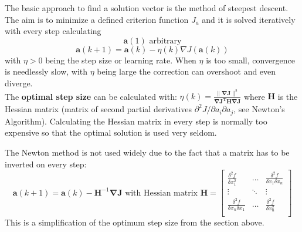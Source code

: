       The basic approach to find a solution vector is the method of steepest descent. The aim is to
      minimize a defined criterion function $J_a$ and it is solved iteratively with every step calculating
      $$\bm a (1) \text{ arbitrary}$$
      $$\bm a (k+1) =  \bm a(k) - \eta(k) \nabla J(\bm a(k))$$
      with $\eta > 0$ being the step size or learning rate. When $\eta$ is too small, convergence is
      needlessly slow, with $\eta$ being large the correction can overshoot and even diverge.\\
      The \textbf{optimal step size} can be calculated with:
      $\eta(k)= \frac{\|\bm{\nabla J}\|^2}{\bm{\nabla J^T  H \nabla J}}$ where $\bm H$ is the Hessian matrix
       (matrix of second partial derivatives $\partial^2 J / \partial a_i \partial a_j$, see Newton's Algorithm).
      Calculating the Hessian matrix in every step is normally too expensive so that the optimal solution is used very seldom.

      The Newton method is not used widely due to the fact that a matrix has to be inverted on every
      step:
      $$\bm a(k+1) = \bm a(k) - \bm H^{-1} \bm \nabla \bm J \text{ with Hessian matrix } \bm H = \begin{bmatrix}
      \frac{\delta^2 f}{\delta x_1^2} & \ldots & \frac{\delta^2 f}{\delta x_1 \delta x_n}\\
      \vdots & \ddots & \vdots \\
      \frac{\delta^2 f}{\delta x_n \delta x_1} & \ldots & \frac{\delta^2 f}{\delta x_n^2}\\
      \end{bmatrix}$$
      This is a simplification of the optimum step size from the section above.
  

